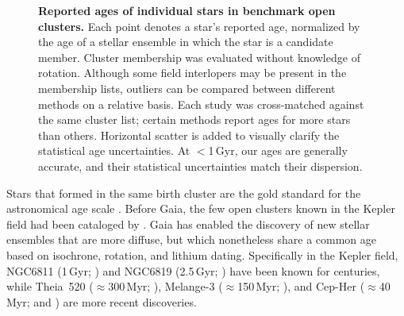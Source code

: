 \documentclass[11pt,twocolumn,tighten]{aastex63}
\begin{document}
\begin{figure}[!t]
	\begin{center}
	\end{center}
	\vspace{-0.5cm}
	\caption{
		{\bf Reported ages of individual stars in benchmark open clusters.}
    Each point denotes a star's reported age, normalized by the age of
    a stellar ensemble in which the star is a candidate member.
    Cluster membership was evaluated without knowledge of rotation.
    Although some field interlopers may be present in the membership
    lists, outliers can be compared between different methods on a
    relative basis.  Each study was cross-matched against the same
    cluster list; certain methods report ages for more stars than
    others.  Horizontal scatter is added to visually clarify the
    statistical age uncertainties.  At $<$1\,Gyr, our ages are
    generally accurate, and their statistical uncertainties match
    their dispersion.
	}
	\label{fig:agescalecompone}
\end{figure}

Stars that formed in the same birth cluster are the gold standard for
the astronomical age scale \citep{Soderblom_2010}.  Before Gaia, the
few open clusters known in the Kepler field had been cataloged by
\citet{1864RSPT..154....1H}.  Gaia has enabled the discovery of
new stellar ensembles that are more diffuse, but which nonetheless share a
common age based on isochrone, rotation, and lithium dating.
Specifically in the Kepler field,
NGC6811 (1\,Gyr; \citealt{Curtis_2019_ngc6811}) and NGC6819 (2.5\,Gyr; \citealt{Meibom_2015}) 
have been known for centuries,
while 
Theia~520 ($\approx$300\,Myr; \citealt{2019AJ....158..122K}), Melange-3 ($\approx$150\,Myr; \citealt{Barber_2022}), and Cep-Her ($\approx$40\,Myr; \citealt{Bouma_2022b} and \citealt{Kerr2024}) are more recent discoveries.
\end{document}
